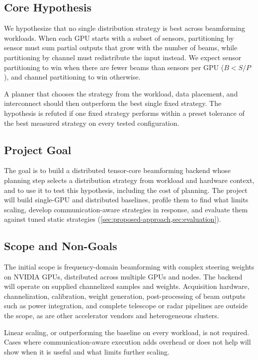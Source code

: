 \subsection{Core Hypothesis}
\label{sec:core-hypothesis}

We hypothesize that no single distribution strategy is best across beamforming workloads. When each GPU starts with a subset of sensors, partitioning by sensor must sum partial outputs that grow with the number of beams, while partitioning by channel must redistribute the input instead. We expect sensor partitioning to win when there are fewer beams than sensors per GPU ($B < S/P$), and channel partitioning to win otherwise.

A planner that chooses the strategy from the workload, data placement, and interconnect should then outperform the best single fixed strategy. The hypothesis is refuted if one fixed strategy performs within a preset tolerance of the best measured strategy on every tested configuration.

\subsection{Project Goal}
\label{sec:project-goal}

The goal is to build a distributed tensor-core beamforming backend whose planning step selects a distribution strategy from workload and hardware context, and to use it to test this hypothesis, including the cost of planning. The project will build single-GPU and distributed baselines, profile them to find what limits scaling, develop communication-aware strategies in response, and evaluate them against tuned static strategies (\cref{sec:proposed-approach,sec:evaluation}).

\subsection{Scope and Non-Goals}
\label{sec:scope-non-goals}

The initial scope is frequency-domain beamforming with complex steering weights on NVIDIA GPUs, distributed across multiple GPUs and nodes. The backend will operate on supplied channelized samples and weights. Acquisition hardware, channelization, calibration, weight generation, post-processing of beam outputs such as power integration, and complete telescope or radar pipelines are outside the scope, as are other accelerator vendors and heterogeneous clusters.

Linear scaling, or outperforming the baseline on every workload, is not required. Cases where communication-aware execution adds overhead or does not help will show when it is useful and what limits further scaling.
